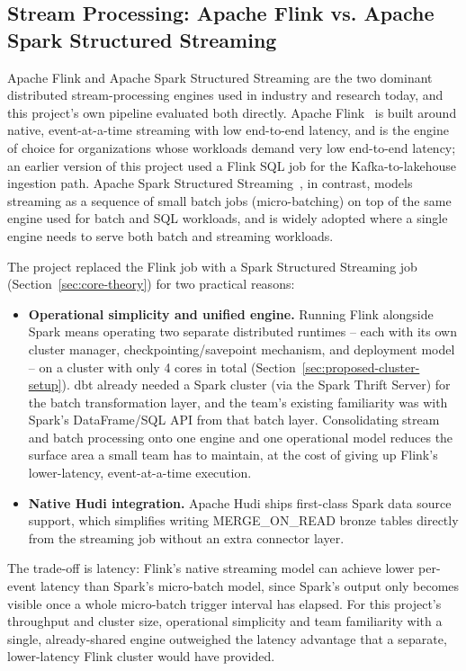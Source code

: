 \subsection{Stream Processing: Apache Flink vs. Apache Spark Structured Streaming}
\label{sec:flink-vs-spark}

Apache Flink and Apache Spark Structured Streaming are the two dominant distributed stream-processing engines used in industry and research today, and this project's own pipeline evaluated both directly. Apache Flink~\cite{flink} is built around native, event-at-a-time streaming with low end-to-end latency, and is the engine of choice for organizations whose workloads demand very low end-to-end latency; an earlier version of this project used a Flink SQL job for the Kafka-to-lakehouse ingestion path. Apache Spark Structured Streaming~\cite{spark-structured-streaming}, in contrast, models streaming as a sequence of small batch jobs (micro-batching) on top of the same engine used for batch and SQL workloads, and is widely adopted where a single engine needs to serve both batch and streaming workloads.

The project replaced the Flink job with a Spark Structured Streaming job (Section~\ref{sec:core-theory}) for two practical reasons:

\begin{itemize}
    \item \textbf{Operational simplicity and unified engine.} Running Flink alongside Spark means operating two separate distributed runtimes -- each with its own cluster manager, checkpointing/savepoint mechanism, and deployment model -- on a cluster with only 4 cores in total (Section~\ref{sec:proposed-cluster-setup}). dbt already needed a Spark cluster (via the Spark Thrift Server) for the batch transformation layer, and the team's existing familiarity was with Spark's DataFrame/SQL API from that batch layer. Consolidating stream and batch processing onto one engine and one operational model reduces the surface area a small team has to maintain, at the cost of giving up Flink's lower-latency, event-at-a-time execution.
    \item \textbf{Native Hudi integration.} Apache Hudi ships first-class Spark data source support, which simplifies writing MERGE\_ON\_READ bronze tables directly from the streaming job without an extra connector layer.
\end{itemize}

The trade-off is latency: Flink's native streaming model can achieve lower per-event latency than Spark's micro-batch model, since Spark's output only becomes visible once a whole micro-batch trigger interval has elapsed. For this project's throughput and cluster size, operational simplicity and team familiarity with a single, already-shared engine outweighed the latency advantage that a separate, lower-latency Flink cluster would have provided.

